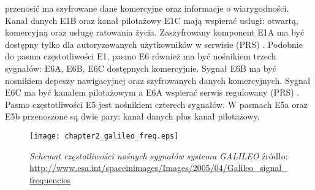 przenosić ma szyfrowane dane komercyjne oraz informacje o wiarygodności. Kanał danych E1B oraz kanał pilotażowy E1C mają wspierać usługi: otwartą, komercyjną oraz 
usługę ratowania życia. Zaszyfrowany komponent E1A ma być dostępny tylko dla autoryzowanych użytkowników w serwisie (PRS) \cite[][strona 387]{hofmann_gnss}.
Podobnie do pasma częstotliwości E1, pasmo E6 również ma być nośnikiem trzech sygnałów: E6A, E6B, E6C dostępnych komercyjnie. 
Sygnał E6B ma być nosnikiem depeszy nawigacyjnej oraz szyfrowanych danych komercyjnych. Sygnał E6C ma być kanałem pilotażowym a E6A wspierać serwis regulowany (PRS)
\cite[][strona 389]{hofmann_gnss}.
Pasmo częstotliwości E5 jest nośnikiem czterech sygnałów. W pasmach E5a oraz E5b przenoszone są dwie pary: kanał danych plus kanał pilotażowy.
\begin{figure}[H]
\centering
\texttt{[image: chapter2\_galileo\_freq.eps]}
\caption{\textit{Schemat częstotliwości nośnych sygnałów systemu GALILEO} źródło: \protect\url{http://www.esa.int/spaceinimages/Images/2005/04/Galileo_signal_frequencies}}
\label{fig:galileo_freq}
\end{figure}
